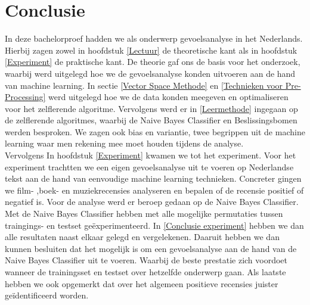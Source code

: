 \chapter{Conclusie}\label{Conclusie}

In deze bachelorproef hadden we als onderwerp gevoelsanalyse in het Nederlands. Hierbij zagen zowel in hoofdstuk \ref{Lectuur} de theoretische kant als in hoofdstuk \ref{Experiment} de praktische kant. De theorie gaf ons de basis voor het onderzoek, waarbij werd uitgelegd hoe we de gevoelsanalyse konden uitvoeren aan de hand van machine learning. In sectie \ref{Vector Space Methode} en \ref{Technieken voor Pre-Processing} werd uitgelegd hoe we de data konden meegeven en optimaliseren voor het zelflerende algoritme. Vervolgens werd er in  \ref{Leermethode} ingegaan op de zelflerende algoritmes, waarbij de  Naive Bayes Classifier en Beslissingsbomen werden besproken. We zagen ook bias en variantie, twee begrippen uit de machine learning waar men rekening mee moet houden tijdens de analyse.\\
Vervolgens In hoofdstuk \ref{Experiment} kwamen we tot het experiment. Voor het experiment trachtten we een eigen gevoelsanalyse uit te voeren op Nederlandse tekst aan de hand van eenvoudige machine learning technieken. Concreter gingen we film- ,boek- en muziekrecensies analyseren en bepalen of de recensie positief of negatief is. Voor de analyse werd er beroep gedaan op de Naive Bayes Classifier. Met de Naive Bayes Classifier hebben met alle mogelijke permutaties tussen traingings- en testset ge\"experimenteerd. In \ref{Conclusie experiment} hebben we dan alle resultaten naast elkaar gelegd en vergelekenen. Daaruit hebben we dan kunnen besluiten dat het mogelijk is om een gevoelsanalyse aan de hand van de Naive Bayes Classifier uit te voeren. Waarbij de beste prestatie zich voordoet wanneer de trainingsset en testset over hetzelfde onderwerp gaan. Als laatste hebben we ook opgemerkt dat over het algemeen positieve recensies juister ge\"identificeerd worden.

